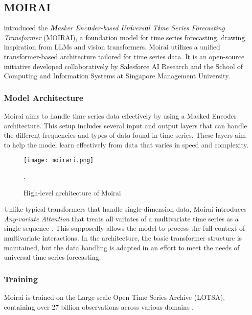 \documentclass[12pt,a4paper]{article}
\begin{document}
\subsection{MOIRAI}

\cite{woo2024unified} introduced the \textit{\textbf{M}asker Enc\textbf{o}der-based Un\textbf{i}vers\textbf{a}l T\textbf{i}me Series Forecasting Transformer} (MOIRAI), a foundation model for time series forecasting, drawing inspiration from LLMs and vision transformers. Moirai utilizes a unified transformer-based architecture tailored for time series data. It is an open-source initiative developed collaboratively by Salesforce AI Research and the School of Computing and Information Systems at Singapore Management University.

\subsubsection{Model Architecture}

Moirai aims to handle time series data effectively by using a Masked Encoder architecture. This setup includes several input and output layers that can handle the different frequencies and types of data found in time series. These layers aim to help the model learn effectively from data that varies in speed and complexity.

\begin{figure}[htbp]
  \centering
  \texttt{[image: moirari.png]}
  \caption{High-level architecture of Moirai \parencite{woo2024unified}}.
  \label{moirari}
\end{figure}

Unlike typical transformers that handle single-dimension data, Moirai introduces \textit{Any-variate Attention} that treats all variates of a multivariate time series as a single sequence \parencite{woo2024unified}. This supposedly allows the model to process the full context of multivariate interactions. In the architecture, the basic transformer structure is maintained, but the data handling is adapted in an effort to meet the needs of universal time series forecasting.

\subsubsection{Training}

Moirai is trained on the Large-scale Open Time Series Archive (LOTSA), containing over 27 billion observations across various domains \parencite{woo2024unified}. 
\end{document}
